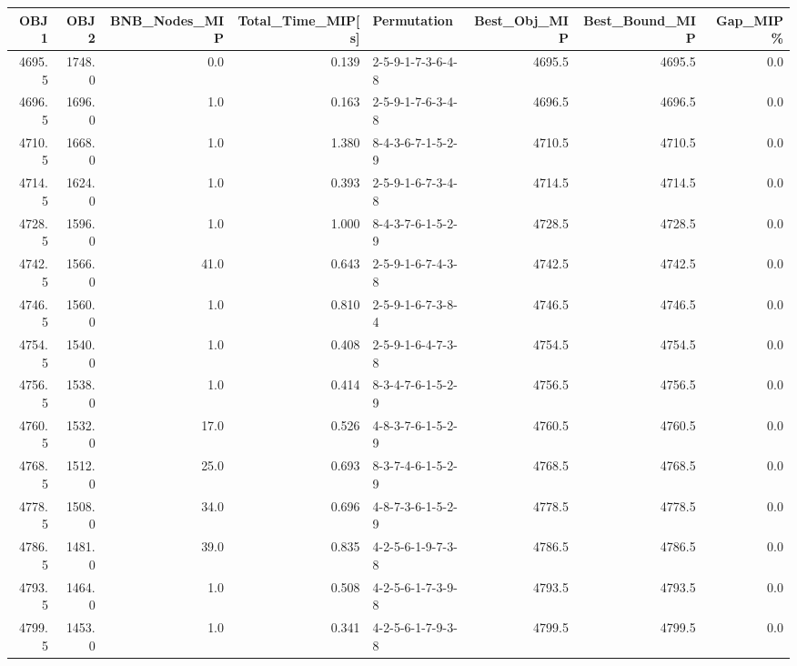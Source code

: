 \begin{tabular}{rrrrlrrr}
\toprule
   OBJ1 &    OBJ2 &  BNB\_Nodes\_MIP &  Total\_Time\_MIP[s] &        Permutation &  Best\_Obj\_MIP &  Best\_Bound\_MIP &  Gap\_MIP\% \\
\midrule
 4695.5 &  1748.0 &            0.0 &              0.139 &  2-5-9-1-7-3-6-4-8 &        4695.5 &          4695.5 &       0.0 \\
 4696.5 &  1696.0 &            1.0 &              0.163 &  2-5-9-1-7-6-3-4-8 &        4696.5 &          4696.5 &       0.0 \\
 4710.5 &  1668.0 &            1.0 &              1.380 &  8-4-3-6-7-1-5-2-9 &        4710.5 &          4710.5 &       0.0 \\
 4714.5 &  1624.0 &            1.0 &              0.393 &  2-5-9-1-6-7-3-4-8 &        4714.5 &          4714.5 &       0.0 \\
 4728.5 &  1596.0 &            1.0 &              1.000 &  8-4-3-7-6-1-5-2-9 &        4728.5 &          4728.5 &       0.0 \\
 4742.5 &  1566.0 &           41.0 &              0.643 &  2-5-9-1-6-7-4-3-8 &        4742.5 &          4742.5 &       0.0 \\
 4746.5 &  1560.0 &            1.0 &              0.810 &  2-5-9-1-6-7-3-8-4 &        4746.5 &          4746.5 &       0.0 \\
 4754.5 &  1540.0 &            1.0 &              0.408 &  2-5-9-1-6-4-7-3-8 &        4754.5 &          4754.5 &       0.0 \\
 4756.5 &  1538.0 &            1.0 &              0.414 &  8-3-4-7-6-1-5-2-9 &        4756.5 &          4756.5 &       0.0 \\
 4760.5 &  1532.0 &           17.0 &              0.526 &  4-8-3-7-6-1-5-2-9 &        4760.5 &          4760.5 &       0.0 \\
 4768.5 &  1512.0 &           25.0 &              0.693 &  8-3-7-4-6-1-5-2-9 &        4768.5 &          4768.5 &       0.0 \\
 4778.5 &  1508.0 &           34.0 &              0.696 &  4-8-7-3-6-1-5-2-9 &        4778.5 &          4778.5 &       0.0 \\
 4786.5 &  1481.0 &           39.0 &              0.835 &  4-2-5-6-1-9-7-3-8 &        4786.5 &          4786.5 &       0.0 \\
 4793.5 &  1464.0 &            1.0 &              0.508 &  4-2-5-6-1-7-3-9-8 &        4793.5 &          4793.5 &       0.0 \\
 4799.5 &  1453.0 &            1.0 &              0.341 &  4-2-5-6-1-7-9-3-8 &        4799.5 &          4799.5 &       0.0 \\

\end{tabular}
